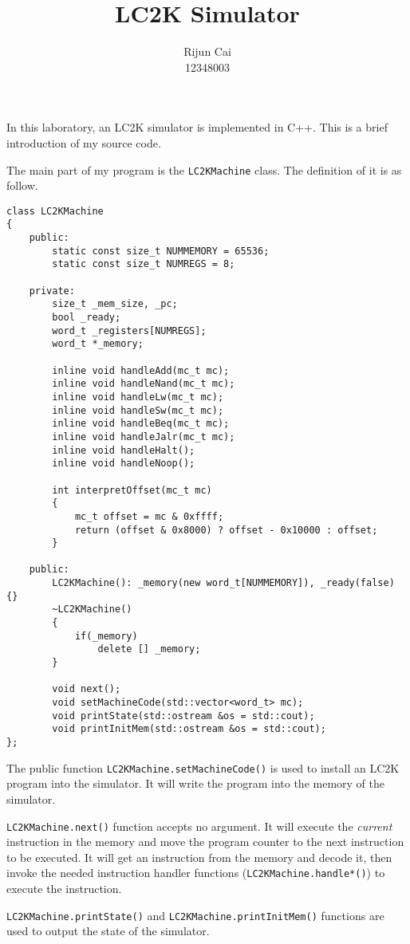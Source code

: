 \documentclass[a4paper]{article}
\title{LC2K Simulator}
\author{Rijun Cai\\12348003}
\begin{document}
\maketitle

In this laboratory, an LC2K simulator is implemented in C++. This is a brief introduction of
my source code.

The main part of my program is the \verb|LC2KMachine| class. The definition of it is as follow.
\begin{verbatim}
class LC2KMachine
{
    public:
        static const size_t NUMMEMORY = 65536;
        static const size_t NUMREGS = 8;

    private:
        size_t _mem_size, _pc;
        bool _ready;
        word_t _registers[NUMREGS];
        word_t *_memory;

        inline void handleAdd(mc_t mc);
        inline void handleNand(mc_t mc);
        inline void handleLw(mc_t mc);
        inline void handleSw(mc_t mc);
        inline void handleBeq(mc_t mc);
        inline void handleJalr(mc_t mc);
        inline void handleHalt();
        inline void handleNoop();

        int interpretOffset(mc_t mc)
        {
            mc_t offset = mc & 0xffff;
            return (offset & 0x8000) ? offset - 0x10000 : offset;
        }

    public:
        LC2KMachine(): _memory(new word_t[NUMMEMORY]), _ready(false) {}
        ~LC2KMachine()
        {
            if(_memory)
                delete [] _memory;
        }

        void next();
        void setMachineCode(std::vector<word_t> mc);
        void printState(std::ostream &os = std::cout);
        void printInitMem(std::ostream &os = std::cout);
};
\end{verbatim}

The public function \verb|LC2KMachine.setMachineCode()| is used to install an LC2K program into the simulator.
It will write the program into the memory of the simulator.

\verb|LC2KMachine.next()| function accepts no argument. It will execute the \emph{current} instruction in the
memory and move the program counter to the next instruction to be executed. It will get an instruction from
the memory and decode it, then invoke the needed instruction handler functions (\verb|LC2KMachine.handle*()|)
to execute the instruction.

\verb|LC2KMachine.printState()| and \verb|LC2KMachine.printInitMem()| functions are used to output the state
of the simulator.
\end{document}
